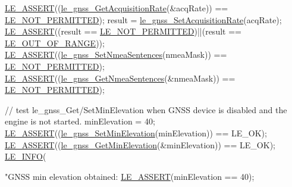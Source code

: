 \begin{DoxyCodeInclude}
    \hyperlink{le__log_8h_ac0dbbef91dc0fed449d0092ff0557b39}{LE\_ASSERT}((\hyperlink{le__gnss__interface_8h_acfa9b25ac13f601921bd9123a1d0daba}{le\_gnss\_GetAcquisitionRate}(&acqRate)) == 
      \hyperlink{le__basics_8h_a1cca095ed6ebab24b57a636382a6c86cac6c0cac62213b786dabd7bf3e73bcec1}{LE\_NOT\_PERMITTED});
    result = \hyperlink{le__gnss__interface_8h_a75d96ec7ac6e0d6b58525e4c523d3b2c}{le\_gnss\_SetAcquisitionRate}(acqRate);
    \hyperlink{le__log_8h_ac0dbbef91dc0fed449d0092ff0557b39}{LE\_ASSERT}((result == \hyperlink{le__basics_8h_a1cca095ed6ebab24b57a636382a6c86cac6c0cac62213b786dabd7bf3e73bcec1}{LE\_NOT\_PERMITTED})||(result == 
      \hyperlink{le__basics_8h_a1cca095ed6ebab24b57a636382a6c86caef8ecf11fa8556fd2d3ca8faab697717}{LE\_OUT\_OF\_RANGE}));
    \hyperlink{le__log_8h_ac0dbbef91dc0fed449d0092ff0557b39}{LE\_ASSERT}((\hyperlink{le__gnss__interface_8h_ab9253e29d74cae6e962dcc8b94f0e3c1}{le\_gnss\_SetNmeaSentences}(nmeaMask)) == 
      \hyperlink{le__basics_8h_a1cca095ed6ebab24b57a636382a6c86cac6c0cac62213b786dabd7bf3e73bcec1}{LE\_NOT\_PERMITTED});
    \hyperlink{le__log_8h_ac0dbbef91dc0fed449d0092ff0557b39}{LE\_ASSERT}((\hyperlink{le__gnss__interface_8h_a985845ac33d35c34ac3099b6557ca8ea}{le\_gnss\_GetNmeaSentences}(&nmeaMask)) == 
      \hyperlink{le__basics_8h_a1cca095ed6ebab24b57a636382a6c86cac6c0cac62213b786dabd7bf3e73bcec1}{LE\_NOT\_PERMITTED});

    \textcolor{comment}{// test le\_gnss\_Get/SetMinElevation when GNSS device is disabled and the engine is not started.}
    minElevation = 40;
    \hyperlink{le__log_8h_ac0dbbef91dc0fed449d0092ff0557b39}{LE\_ASSERT}((\hyperlink{le__gnss__interface_8h_a78982eb8669530eef1bbc79ff79347e4}{le\_gnss\_SetMinElevation}(minElevation)) == LE\_OK);
    \hyperlink{le__log_8h_ac0dbbef91dc0fed449d0092ff0557b39}{LE\_ASSERT}((\hyperlink{le__gnss__interface_8h_ad8476e020a2eb0188703e78eed5818da}{le\_gnss\_GetMinElevation}(&minElevation)) == LE\_OK);
    \hyperlink{le__log_8h_a23e6d206faa64f612045d688cdde5808}{LE\_INFO}(\textcolor{stringliteral}{"GNSS min elevation obtained: %
    \hyperlink{le__log_8h_ac0dbbef91dc0fed449d0092ff0557b39}{LE\_ASSERT}(minElevation == 40);

}
\end{DoxyCodeInclude}
